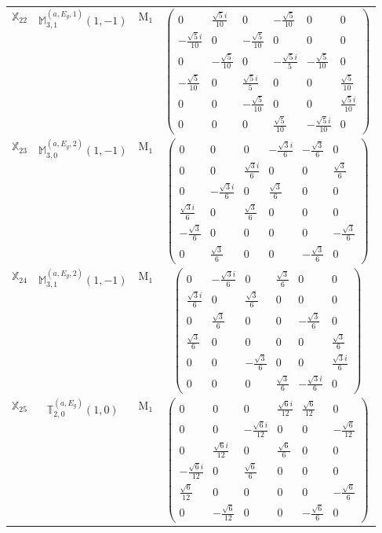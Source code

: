 \documentclass[fleqn,10pt,landscape]{article}
\begin{document}
\begin{itemize}
\begin{center}
\begin{longtable}{c|c|c|c}
$ \mathbb{X}_{22} $ & $\mathbb{M}_{3,1}^{(a,E_{g},1)}(1,-1)$ & M$_{1}$ & $\begin{pmatrix} 0 & \frac{\sqrt{5} i}{10} & 0 & - \frac{\sqrt{5}}{10} & 0 & 0 \\ - \frac{\sqrt{5} i}{10} & 0 & - \frac{\sqrt{5}}{10} & 0 & 0 & 0 \\ 0 & - \frac{\sqrt{5}}{10} & 0 & - \frac{\sqrt{5} i}{5} & - \frac{\sqrt{5}}{10} & 0 \\ - \frac{\sqrt{5}}{10} & 0 & \frac{\sqrt{5} i}{5} & 0 & 0 & \frac{\sqrt{5}}{10} \\ 0 & 0 & - \frac{\sqrt{5}}{10} & 0 & 0 & \frac{\sqrt{5} i}{10} \\ 0 & 0 & 0 & \frac{\sqrt{5}}{10} & - \frac{\sqrt{5} i}{10} & 0 \end{pmatrix}$ \\
$ \mathbb{X}_{23} $ & $\mathbb{M}_{3,0}^{(a,E_{g},2)}(1,-1)$ & M$_{1}$ & $\begin{pmatrix} 0 & 0 & 0 & - \frac{\sqrt{3} i}{6} & - \frac{\sqrt{3}}{6} & 0 \\ 0 & 0 & \frac{\sqrt{3} i}{6} & 0 & 0 & \frac{\sqrt{3}}{6} \\ 0 & - \frac{\sqrt{3} i}{6} & 0 & \frac{\sqrt{3}}{6} & 0 & 0 \\ \frac{\sqrt{3} i}{6} & 0 & \frac{\sqrt{3}}{6} & 0 & 0 & 0 \\ - \frac{\sqrt{3}}{6} & 0 & 0 & 0 & 0 & - \frac{\sqrt{3}}{6} \\ 0 & \frac{\sqrt{3}}{6} & 0 & 0 & - \frac{\sqrt{3}}{6} & 0 \end{pmatrix}$ \\
$ \mathbb{X}_{24} $ & $\mathbb{M}_{3,1}^{(a,E_{g},2)}(1,-1)$ & M$_{1}$ & $\begin{pmatrix} 0 & - \frac{\sqrt{3} i}{6} & 0 & \frac{\sqrt{3}}{6} & 0 & 0 \\ \frac{\sqrt{3} i}{6} & 0 & \frac{\sqrt{3}}{6} & 0 & 0 & 0 \\ 0 & \frac{\sqrt{3}}{6} & 0 & 0 & - \frac{\sqrt{3}}{6} & 0 \\ \frac{\sqrt{3}}{6} & 0 & 0 & 0 & 0 & \frac{\sqrt{3}}{6} \\ 0 & 0 & - \frac{\sqrt{3}}{6} & 0 & 0 & \frac{\sqrt{3} i}{6} \\ 0 & 0 & 0 & \frac{\sqrt{3}}{6} & - \frac{\sqrt{3} i}{6} & 0 \end{pmatrix}$ \\
$ \mathbb{X}_{25} $ & $\mathbb{T}_{2,0}^{(a,E_{g})}(1,0)$ & M$_{1}$ & $\begin{pmatrix} 0 & 0 & 0 & \frac{\sqrt{6} i}{12} & \frac{\sqrt{6}}{12} & 0 \\ 0 & 0 & - \frac{\sqrt{6} i}{12} & 0 & 0 & - \frac{\sqrt{6}}{12} \\ 0 & \frac{\sqrt{6} i}{12} & 0 & \frac{\sqrt{6}}{6} & 0 & 0 \\ - \frac{\sqrt{6} i}{12} & 0 & \frac{\sqrt{6}}{6} & 0 & 0 & 0 \\ \frac{\sqrt{6}}{12} & 0 & 0 & 0 & 0 & - \frac{\sqrt{6}}{6} \\ 0 & - \frac{\sqrt{6}}{12} & 0 & 0 & - \frac{\sqrt{6}}{6} & 0 \end{pmatrix}$ \\

\end{longtable}
\end{center}
\end{itemize}
\end{document}
